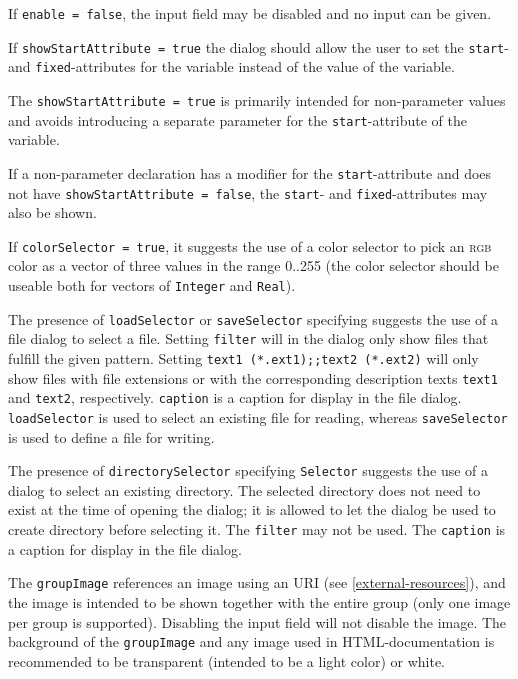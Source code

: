 \begin{annotationdefinition}[Dialog]
\begin{semantics}
If \lstinline!enable = false!, the input field may be disabled and no input can be given.

If \lstinline!showStartAttribute = true! the dialog should allow the user to set the \lstinline!start!- and \lstinline!fixed!-attributes for the variable instead of the value of the variable.

\begin{nonnormative}
The \lstinline!showStartAttribute = true! is primarily intended for non-parameter values and avoids introducing a separate parameter for the \lstinline!start!-attribute of the variable.
\end{nonnormative}

If a non-parameter declaration has a modifier for the \lstinline!start!-attribute and does not have \lstinline!showStartAttribute = false!, the \lstinline!start!- and \lstinline!fixed!-attributes may also be shown.

If \lstinline!colorSelector = true!, it suggests the use of a color selector to pick an \textsc{rgb} color as a vector of three values in the range 0..255 (the color selector should be useable both for vectors of \lstinline!Integer! and \lstinline!Real!).

The presence of \lstinline!loadSelector! or \lstinline!saveSelector! specifying  suggests the use of a file dialog to select a file.
Setting \lstinline!filter! will in the dialog only show files that fulfill the given pattern.
Setting \lstinline!text1 (*.ext1);;text2 (*.ext2)! will only show files with file extensions  or  with the corresponding description texts \lstinline!text1! and \lstinline!text2!, respectively.
\lstinline!caption! is a caption for display in the file dialog.
\lstinline!loadSelector! is used to select an existing file for reading, whereas \lstinline!saveSelector! is used to define a file for writing.

The presence of \lstinline!directorySelector! specifying \lstinline!Selector! suggests the use of a dialog to select an existing directory.
The selected directory does not need to exist at the time of opening the dialog; it is allowed to let the dialog be used to create directory before selecting it.
The \lstinline!filter! may not be used.
The \lstinline!caption! is a caption for display in the file dialog.

The \lstinline!groupImage! references an image using an URI (see \cref{external-resources}), and the image is intended to be shown together with the entire group (only one image per group is supported).
Disabling the input field will not disable the image.
The background of the \lstinline!groupImage! and any image used in HTML-documentation is recommended to be transparent (intended to be a light color) or white.


\end{semantics}
\end{annotationdefinition}

